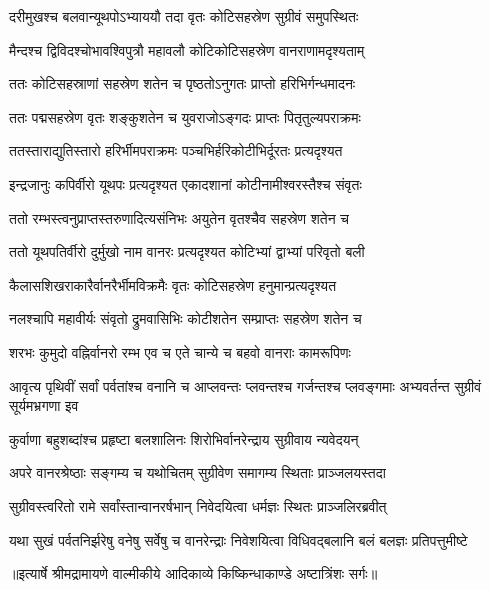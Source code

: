 \twolineshloka
{दरीमुखश्च बलवान्यूथपोऽभ्याययौ तदा}
{वृतः कोटिसहस्रेण सुग्रीवं समुपस्थितः} %

\twolineshloka
{मैन्दश्च द्विविदश्चोभावश्विपुत्रौ महावलौ}
{कोटिकोटिसहस्रेण वानराणामदृश्यताम्} %

\twolineshloka
{ततः कोटिसहस्राणां सहस्रेण शतेन च}
{पृष्ठतोऽनुगतः प्राप्तो हरिभिर्गन्धमादनः} %

\twolineshloka
{ततः पद्मसहस्रेण वृतः शङ्कुशतेन च}
{युवराजोऽङ्गदः प्राप्तः पितृतुल्यपराक्रमः} %

\twolineshloka
{ततस्ताराद्युतिस्तारो हरिर्भीमपराक्रमः}
{पञ्चभिर्हरिकोटीभिर्दूरतः प्रत्यदृश्यत} %

\twolineshloka
{इन्द्रजानुः कपिर्वीरो यूथपः प्रत्यदृश्यत}
{एकादशानां कोटीनामीश्वरस्तैश्च संवृतः} %

\twolineshloka
{ततो रम्भस्त्वनुप्राप्तस्तरुणादित्यसंनिभः}
{अयुतेन वृतश्चैव सहस्रेण शतेन च} %

\twolineshloka
{ततो यूथपतिर्वीरो दुर्मुखो नाम वानरः}
{प्रत्यदृश्यत कोटिभ्यां द्वाभ्यां परिवृतो बली} %

\twolineshloka
{कैलासशिखराकारैर्वानरैर्भीमविक्रमैः}
{वृतः कोटिसहस्रेण हनुमान्प्रत्यदृश्यत} %

\twolineshloka
{नलश्चापि महावीर्यः संवृतो द्रुमवासिभिः}
{कोटीशतेन सम्प्राप्तः सहस्रेण शतेन च} %

\twolineshloka
{शरभः कुमुदो वह्निर्वानरो रम्भ एव च}
{एते चान्ये च बहवो वानराः कामरूपिणः} %

\threelineshloka
{आवृत्य पृथिवीं सर्वां पर्वतांश्च वनानि च}
{आप्लवन्तः प्लवन्तश्च गर्जन्तश्च प्लवङ्गमाः}
{अभ्यवर्तन्त सुग्रीवं सूर्यमभ्रगणा इव} %

\twolineshloka
{कुर्वाणा बहुशब्दांश्च प्रहृष्टा बलशालिनः}
{शिरोभिर्वानरेन्द्राय सुग्रीवाय न्यवेदयन्} %

\twolineshloka
{अपरे वानरश्रेष्ठाः सङ्गम्य च यथोचितम्}
{सुग्रीवेण समागम्य स्थिताः प्राञ्जलयस्तदा} %

\twolineshloka
{सुग्रीवस्त्वरितो रामे सर्वांस्तान्वानरर्षभान्}
{निवेदयित्वा धर्मज्ञः स्थितः प्राञ्जलिरब्रवीत्} %

\fourlineindentedshloka
{यथा सुखं पर्वतनिर्झरेषु}
{वनेषु सर्वेषु च वानरेन्द्राः}
{निवेशयित्वा विधिवद्बलानि}
{बलं बलज्ञः प्रतिपत्तुमीष्टे} %


{॥इत्यार्षे श्रीमद्रामायणे वाल्मीकीये आदिकाव्ये किष्किन्धाकाण्डे अष्टात्रिंशः सर्गः॥}

